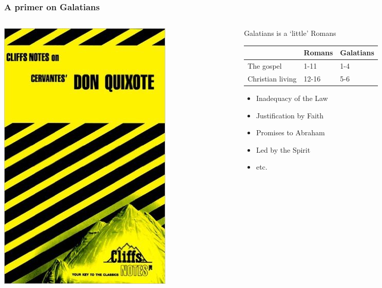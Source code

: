 \begin{frame}
\frametitle{A primer on Galatians}
\begin{columns}[T]
\begin{column}{0.3\textwidth}
	\includegraphics[width=\columnwidth]{figures/cliffNotes.jpg}
\end{column}
\begin{column}{0.7\textwidth}
	Galatians is a `little' Romans
	\begin{table}
	\begin{tabular}{lll}
~ & Romans & Galatians\\
\hline
The gospel & 1-11 & 1-4 \\ 
Christian living & 12-16 & 5-6 \\
\end{tabular}
\end{table}
\begin{itemize}
	\item Inadequacy of the Law
	\item Justification by Faith
	\item Promises to Abraham
	\item Led by the Spirit
	\item etc.
\end{itemize}
\end{column}
\end{columns}


\end{frame}
